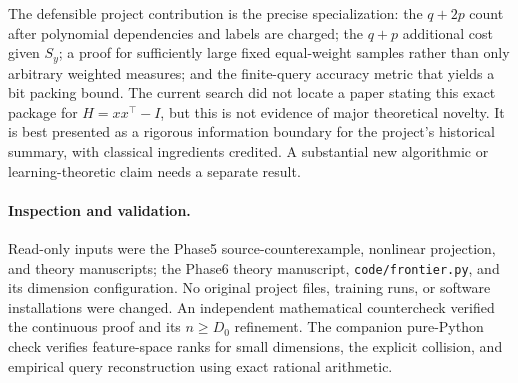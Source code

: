 \documentclass[11pt]{article}
\begin{document}
The defensible project contribution is the precise specialization:
the $q+2p$ count after polynomial dependencies and labels are charged;
the $q+p$ additional cost given $S_y$; a proof for sufficiently large
fixed equal-weight samples rather than only arbitrary weighted
measures; and the finite-query accuracy metric that yields a bit
packing bound. The current search did not locate a paper stating
this exact package for $H=xx^\top-I$, but this is not evidence of
major theoretical novelty. It is best presented as a rigorous
information boundary for the project's historical summary, with
classical ingredients credited. A substantial new algorithmic or
learning-theoretic claim needs a separate result.

\paragraph{Inspection and validation.}
Read-only inputs were the Phase5 source-counterexample, nonlinear
projection, and theory manuscripts; the Phase6 theory manuscript,
\texttt{code/frontier.py}, and its dimension configuration.
No original project files, training runs,
or software installations were changed. An independent mathematical
countercheck verified the continuous proof and its $n\ge D_0$
refinement. The companion pure-Python check verifies feature-space
ranks for small dimensions, the explicit collision, and empirical
query reconstruction using exact rational arithmetic.
\end{document}
